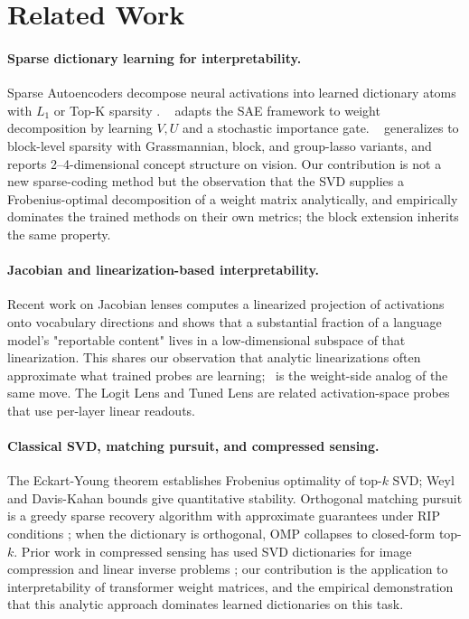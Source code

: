 \section{Related Work}
\label{sec:related}

\paragraph{Sparse dictionary learning for interpretability.} Sparse Autoencoders decompose neural activations into learned dictionary atoms with $L_1$ or Top-K sparsity \citep{bricken2023towards, cunningham2023sparse, gao2024topksae}. \vpd\ \citep{bushnaq2026vpd} adapts the SAE framework to weight decomposition by learning $V, U$ and a stochastic importance gate. \bsf\ \citep{goodfire2026bsf} generalizes to block-level sparsity with Grassmannian, block, and group-lasso variants, and reports 2--4-dimensional concept structure on vision. Our contribution is not a new sparse-coding method but the observation that the SVD supplies a Frobenius-optimal decomposition of a weight matrix analytically, and empirically dominates the trained methods on their own metrics; the block extension inherits the same property.

\paragraph{Jacobian and linearization-based interpretability.} Recent work on Jacobian lenses \citep{anthropic2026jlens} computes a linearized projection of activations onto vocabulary directions and shows that a substantial fraction of a language model's "reportable content" lives in a low-dimensional subspace of that linearization. This shares our observation that analytic linearizations often approximate what trained probes are learning; \svdomp\ is the weight-side analog of the same move. The Logit Lens \citep{nostalgebraist2020logitlens} and Tuned Lens \citep{belrose2023tunedlens} are related activation-space probes that use per-layer linear readouts.

\paragraph{Classical SVD, matching pursuit, and compressed sensing.} The Eckart-Young theorem \citep{eckart1936approximation} establishes Frobenius optimality of top-$k$ SVD; Weyl and Davis-Kahan bounds \citep{davis1970rotation} give quantitative stability. Orthogonal matching pursuit \citep{pati1993omp} is a greedy sparse recovery algorithm with approximate guarantees under RIP conditions \citep{tropp2004greed}; when the dictionary is orthogonal, OMP collapses to closed-form top-$k$. Prior work in compressed sensing has used SVD dictionaries for image compression and linear inverse problems \citep{aharon2006ksvd}; our contribution is the application to interpretability of transformer weight matrices, and the empirical demonstration that this analytic approach dominates learned dictionaries on this task.

